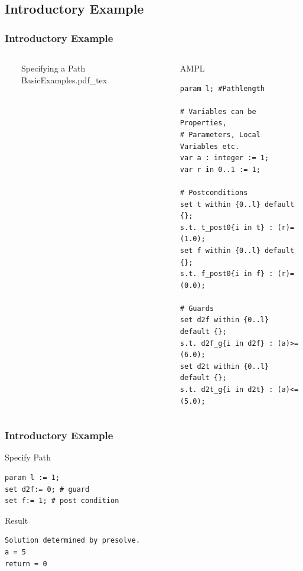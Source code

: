 \documentclass{beamer}
\begin{document}
\subsection{Introductory Example}
\begin{frame}[fragile]
\frametitle{Introductory Example}
\begin{columns}
  \ 
	\begin{block}{Specifying a Path} 
	\def\svgwidth{\textwidth}
	{BasicExamples.pdf_tex}
	\end{block} 
 \ 
	\begin{block}{AMPL} 
		\begin{lstlisting}[basicstyle=\ttfamily\scriptsize,language=ampl]
param l; #Pathlength

# Variables can be Properties, 
# Parameters, Local Variables etc.
var a : integer := 1;
var r in 0..1 := 1;

# Postconditions
set t within {0..l} default {};
s.t. t_post0{i in t} : (r)=(1.0);
set f within {0..l} default {};
s.t. f_post0{i in f} : (r)=(0.0);

# Guards
set d2f within {0..l} default {};
s.t. d2f_g{i in d2f} : (a)>=(6.0);
set d2t within {0..l} default {};
s.t. d2t_g{i in d2t} : (a)<=(5.0);
\end{lstlisting}
	\end{block} 
\end{columns}
\end{frame}

\begin{frame}[fragile]
\frametitle{Introductory Example}
	\begin{block}{Specify Path} 
		\begin{lstlisting}[basicstyle=\ttfamily\small,language=ampl]
param l := 1;
set d2f:= 0; # guard 
set f:= 1; # post condition
		\end{lstlisting}
	\end{block} 
	\begin{block}{Result} 
		\begin{lstlisting}[basicstyle=\ttfamily\small,language=ampl]
Solution determined by presolve.
a = 5
return = 0
		\end{lstlisting}
	\end{block}
\end{frame}


\end{document}
